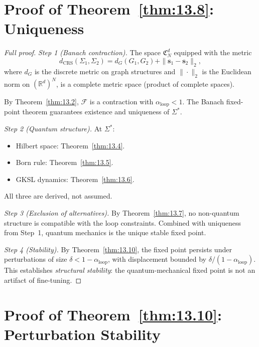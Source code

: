\section{Proof of Theorem~\ref{thm:13.8}: Uniqueness}
\label{app:pf-uniqueness}

\begin{proof}[Full proof]
\emph{Step 1 (Banach contraction).}
The space $\mathfrak{C}_N^d$ equipped with the metric
\[
  d_{\mathrm{CRS}}(\Sigma_1, \Sigma_2)
  = d_G(G_1, G_2) + \|\boldsymbol{s}_1 - \boldsymbol{s}_2\|_2,
\]
where $d_G$ is the discrete metric on graph structures and
$\|\cdot\|_2$ is the Euclidean norm on $(\mathbb{R}^d)^N$, is a
complete metric space (product of complete spaces).

By Theorem~\ref{thm:13.2}, $\mathcal{F}$ is a contraction with
$\alpha_{\mathrm{loop}} < 1$.  The Banach fixed-point theorem
guarantees existence and uniqueness of $\Sigma^*$.

\emph{Step 2 (Quantum structure).}
At $\Sigma^*$:
\begin{itemize}
  \item Hilbert space: Theorem~\ref{thm:13.4}.
  \item Born rule: Theorem~\ref{thm:13.5}.
  \item GKSL dynamics: Theorem~\ref{thm:13.6}.
\end{itemize}
All three are derived, not assumed.

\emph{Step 3 (Exclusion of alternatives).}
By Theorem~\ref{thm:13.7}, no non-quantum structure is compatible
with the loop constraints.  Combined with uniqueness from Step~1,
quantum mechanics is the unique stable fixed point.

\emph{Step 4 (Stability).}
By Theorem~\ref{thm:13.10}, the fixed point persists under
perturbations of size $\delta < 1 - \alpha_{\mathrm{loop}}$,
with displacement bounded by $\delta / (1 - \alpha_{\mathrm{loop}})$.
This establishes \emph{structural stability}: the quantum-mechanical
fixed point is not an artifact of fine-tuning.
\end{proof}

\section{Proof of Theorem~\ref{thm:13.10}: Perturbation Stability}
\label{app:pf-perturbation}

